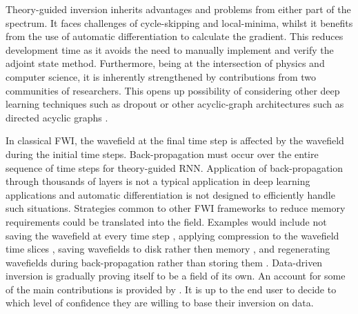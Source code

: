 Theory-guided inversion inherits advantages and problems from either part of the spectrum. It faces challenges of cycle-skipping and local-minima, whilst it benefits from the use of automatic differentiation to calculate the gradient. This reduces development time as it avoids the need to manually implement and verify the adjoint state method. Furthermore, being at the intersection of physics and computer science, it is inherently strengthened by contributions from two communities of researchers. This opens up possibility of considering other deep learning techniques such as dropout or other acyclic-graph architectures such as directed acyclic graphs \citep{Bogaerts2020}.

In classical FWI, the wavefield at the final time step is affected by the wavefield during the initial time steps. Back-propagation must occur over the entire sequence of time steps for theory-guided RNN. Application of back-propagation through thousands of layers is not a typical application in deep learning applications and automatic differentiation is not designed to efficiently handle such situations. Strategies common to other FWI frameworks to reduce memory requirements could be translated into the field. Examples would include not saving the wavefield at every time step \citep{Nguyen2015}, applying compression to the wavefield time slices \citep{Boehm2015,Kalita2017}, saving wavefields to disk rather then memory \citep{Shen2015}, and regenerating wavefields during back-propagation rather than storing them \citep{Malcolm2016, Yao2020}. Data-driven inversion is gradually proving itself to be a field of its own. An account for some of the main contributions is provided by \cite{Arridge2019}. It is up to the end user to decide to which level of confidence they are willing to base their inversion on data.

